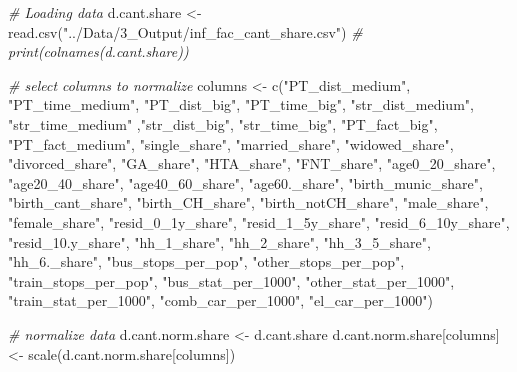 \documentclass[
]{article}
\newenvironment{Shaded}{\begin{snugshade}}{\end{snugshade}}
\newcommand{\CommentTok}[1]{\textcolor[rgb]{0.56,0.35,0.01}{\textit{#1}}}
\newcommand{\FunctionTok}[1]{\textcolor[rgb]{0.00,0.00,0.00}{#1}}
\newcommand{\NormalTok}[1]{#1}
\newcommand{\OtherTok}[1]{\textcolor[rgb]{0.56,0.35,0.01}{#1}}
\newcommand{\StringTok}[1]{\textcolor[rgb]{0.31,0.60,0.02}{#1}}
\begin{document}
\begin{Shaded}
\begin{Highlighting}[]
\CommentTok{\# Loading data}
\NormalTok{d.cant.share }\OtherTok{\textless{}{-}} \FunctionTok{read.csv}\NormalTok{(}\StringTok{"../Data/3\_Output/inf\_fac\_cant\_share.csv"}\NormalTok{)}
\CommentTok{\# print(colnames(d.cant.share))}

\CommentTok{\# select columns to normalize}
\NormalTok{columns }\OtherTok{\textless{}{-}} \FunctionTok{c}\NormalTok{(}\StringTok{"PT\_dist\_medium"}\NormalTok{, }\StringTok{"PT\_time\_medium"}\NormalTok{, }\StringTok{"PT\_dist\_big"}\NormalTok{, }\StringTok{"PT\_time\_big"}\NormalTok{,}
             \StringTok{"str\_dist\_medium"}\NormalTok{, }\StringTok{"str\_time\_medium"}\NormalTok{ ,}\StringTok{"str\_dist\_big"}\NormalTok{, }\StringTok{"str\_time\_big"}\NormalTok{,}
             \StringTok{"PT\_fact\_big"}\NormalTok{, }\StringTok{"PT\_fact\_medium"}\NormalTok{, }\StringTok{"single\_share"}\NormalTok{, }\StringTok{"married\_share"}\NormalTok{, }
             \StringTok{"widowed\_share"}\NormalTok{, }\StringTok{"divorced\_share"}\NormalTok{, }\StringTok{"GA\_share"}\NormalTok{, }\StringTok{"HTA\_share"}\NormalTok{,}
             \StringTok{"FNT\_share"}\NormalTok{, }\StringTok{"age0\_20\_share"}\NormalTok{, }\StringTok{"age20\_40\_share"}\NormalTok{, }\StringTok{"age40\_60\_share"}\NormalTok{,}
             \StringTok{"age60.\_share"}\NormalTok{, }\StringTok{"birth\_munic\_share"}\NormalTok{, }\StringTok{"birth\_cant\_share"}\NormalTok{, }
             \StringTok{"birth\_CH\_share"}\NormalTok{, }\StringTok{"birth\_notCH\_share"}\NormalTok{, }\StringTok{"male\_share"}\NormalTok{, }\StringTok{"female\_share"}\NormalTok{,}
             \StringTok{"resid\_0\_1y\_share"}\NormalTok{, }\StringTok{"resid\_1\_5y\_share"}\NormalTok{, }\StringTok{"resid\_6\_10y\_share"}\NormalTok{, }
             \StringTok{"resid\_10.y\_share"}\NormalTok{, }\StringTok{"hh\_1\_share"}\NormalTok{, }\StringTok{"hh\_2\_share"}\NormalTok{, }\StringTok{"hh\_3\_5\_share"}\NormalTok{, }
             \StringTok{"hh\_6.\_share"}\NormalTok{, }\StringTok{"bus\_stops\_per\_pop"}\NormalTok{, }\StringTok{"other\_stops\_per\_pop"}\NormalTok{, }
             \StringTok{"train\_stops\_per\_pop"}\NormalTok{, }\StringTok{"bus\_stat\_per\_1000"}\NormalTok{, }\StringTok{"other\_stat\_per\_1000"}\NormalTok{,}
             \StringTok{"train\_stat\_per\_1000"}\NormalTok{, }\StringTok{"comb\_car\_per\_1000"}\NormalTok{, }\StringTok{"el\_car\_per\_1000"}\NormalTok{)}

\CommentTok{\# normalize data}
\NormalTok{d.cant.norm.share }\OtherTok{\textless{}{-}}\NormalTok{ d.cant.share}
\NormalTok{d.cant.norm.share[columns] }\OtherTok{\textless{}{-}} \FunctionTok{scale}\NormalTok{(d.cant.norm.share[columns])}
\end{Highlighting}
\end{Shaded}
\end{document}
